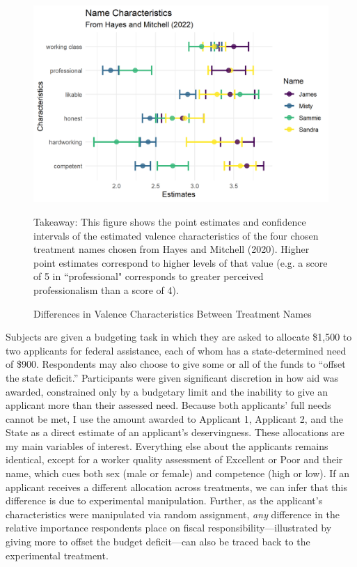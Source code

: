 \documentclass[12pt]{article}%
\begin{document}
\begin{doublespace}
\begin{figure}[h!]
	\centering
	\includegraphics[scale=1]{figs/characteristics.png}
	{\singlespacing
		\parbox{0.75\textwidth}{\scriptsize%
			Takeaway: This figure shows the point estimates and confidence intervals of the estimated valence characteristics of the four chosen treatment names chosen from Hayes and Mitchell (2020). Higher point estimates correspond to higher levels of that value (e.g. a score of 5 in ``professional" corresponds to greater perceived professionalism than a score of 4).
	}}
	\caption{Differences in Valence Characteristics Between Treatment Names}
	\label{characteristics}
\end{figure}

Subjects are given a budgeting task in which they are asked to allocate \$1,500 to two applicants for federal assistance, each of whom has a state-determined need of \$900. Respondents may also choose to give some or all of the funds to ``offset the state deficit.” Participants were given significant discretion in how aid was awarded, constrained only by a budgetary limit and the inability to give an applicant more than their assessed need. Because both applicants’ full needs cannot be met, I use the amount awarded to Applicant 1, Applicant 2, and the State as a direct estimate of an applicant’s deservingness. These allocations are my main variables of interest. Everything else about the applicants remains identical, except for a worker quality assessment of Excellent or Poor and their name, which cues both sex (male or female) and competence (high or low). If an applicant receives a different allocation across treatments, we can infer that this difference is due to experimental manipulation. Further, as the applicant’s characteristics were manipulated via random assignment, \textit{any} difference in the relative importance respondents place on fiscal responsibility—illustrated by giving more to offset the budget deficit—can also be traced back to the experimental treatment. 


\end{doublespace}
\end{document}
